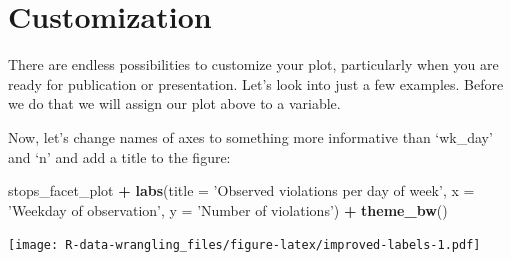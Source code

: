 \documentclass[]{book}
\newenvironment{Shaded}{\begin{snugshade}}{\end{snugshade}}
\newcommand{\DataTypeTok}[1]{\textcolor[rgb]{0.13,0.29,0.53}{#1}}
\newcommand{\KeywordTok}[1]{\textcolor[rgb]{0.13,0.29,0.53}{\textbf{#1}}}
\newcommand{\NormalTok}[1]{#1}
\newcommand{\OperatorTok}[1]{\textcolor[rgb]{0.81,0.36,0.00}{\textbf{#1}}}
\newcommand{\OtherTok}[1]{\textcolor[rgb]{0.56,0.35,0.01}{#1}}
\newcommand{\StringTok}[1]{\textcolor[rgb]{0.31,0.60,0.02}{#1}}
\begin{document}
\hypertarget{customization}{%
\section{Customization}\label{customization}}

There are endless possibilities to customize your plot, particularly when you are ready for publication or presentation. Let's look into just a few examples. Before we do that we will assign our plot above to a variable.

\begin{Shaded}
\end{Shaded}

Now, let's change names of axes to something more informative than `wk\_day' and `n' and add a title to the figure:

\begin{Shaded}
\begin{Highlighting}[]
\NormalTok{stops_facet_plot }\OperatorTok{+}
\StringTok{  }\KeywordTok{labs}\NormalTok{(}\DataTypeTok{title =} \StringTok{'Observed violations per day of week'}\NormalTok{,}
         \DataTypeTok{x =} \StringTok{'Weekday of observation'}\NormalTok{,}
         \DataTypeTok{y =} \StringTok{'Number of violations'}\NormalTok{) }\OperatorTok{+}
\StringTok{  }\KeywordTok{theme_bw}\NormalTok{()}
\end{Highlighting}
\end{Shaded}

\texttt{[image: R-data-wrangling\_files/figure-latex/improved-labels-1.pdf]}
\end{document}
